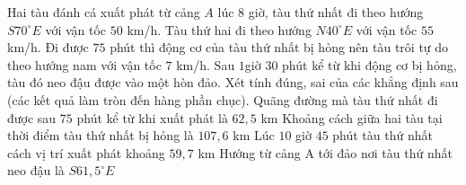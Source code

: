 \begin{ex}%
Hai tàu đánh cá xuất phát từ cảng $A$ lúc $8$ giờ, tàu thứ nhất đi theo hướng $S70^\circ E$ với vận tốc $50$ km/h. Tàu thứ hai đi theo hướng $N40^\circ E$ với vận tốc $55$ km/h. Đi được $75$ phút thì động cơ của tàu thứ nhất bị hỏng nên tàu trôi tự do theo hướng nam với vận tốc $7$ km/h. Sau $1$giờ $30$ phút kể từ khi động cơ bị hỏng, tàu đó neo đậu được vào một hòn đảo. Xét tính đúng, sai của các khẳng định sau (các kết quả làm tròn đến hàng phần chục).
\choiceTF
{\True Quãng đường mà tàu thứ nhất đi được sau $75$ phút kể từ khi xuất phát là $62{,}5$ km}
{Khoảng cách giữa hai tàu tại thời điểm tàu thứ nhất bị hỏng là $107{,}6$ km}
{Lúc $10$ giờ $45$ phút tàu thứ nhất cách vị trí xuất phát khoảng $59{,}7$ km}
{\True Hướng từ cảng A tới đảo nơi tàu thứ nhất neo đậu là $S61{,}5^\circ E$}
\end{ex}
